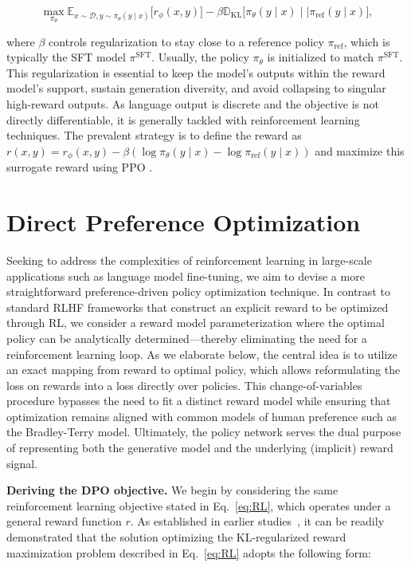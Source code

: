 \begin{equation}\label{eq:RL}
\max_{\pi_{\theta}}  \mathbb{E}_{x\sim \mathcal{D}, y\sim \pi_{\theta}(y \mid x)}\bigl[r_{\phi}(x, y)\bigr] - \beta\mathbb{D}_{\textrm{KL}}\bigl[\pi_{\theta}(y\mid x)\mid \mid \pi_\text{ref}(y\mid x)\bigr],
\end{equation}

where $\beta$ controls regularization to stay close to a reference policy $\pi_\text{ref}$, which is typically the SFT model $\pi^\text{SFT}$. Usually, the policy $\pi_\theta$ is initialized to match $\pi^\text{SFT}$. This regularization is essential to keep the model’s outputs within the reward model's support, sustain generation diversity, and avoid collapsing to singular high-reward outputs. As language output is discrete and the objective is not directly differentiable, it is generally tackled with reinforcement learning techniques. The prevalent strategy \citep{ziegler2020finetuning, stiennon2022learning, bai2022training, ouyang2022training} is to define the reward as ${r(x, y) = r_{\phi}(x, y) -\beta (\log \pi_{\theta}(y\mid x) - \log \pi_\text{ref}(y\mid x))}$ and maximize this surrogate reward using PPO \cite{schulman2017proximal}.

\section{Direct Preference Optimization}\label{sec:DPO}

Seeking to address the complexities of reinforcement learning in large-scale applications such as language model fine-tuning, we aim to devise a more straightforward preference-driven policy optimization technique. In contrast to standard RLHF frameworks that construct an explicit reward to be optimized through RL, we consider a reward model parameterization where the optimal policy can be analytically determined—thereby eliminating the need for a reinforcement learning loop. As we elaborate below, the central idea is to utilize an exact mapping from reward to optimal policy, which allows reformulating the loss on rewards into a loss directly over policies. This change-of-variables procedure bypasses the need to fit a distinct reward model while ensuring that optimization remains aligned with common models of human preference such as the Bradley-Terry model. Ultimately, the policy network serves the dual purpose of representing both the generative model and the underlying (implicit) reward signal.

\textbf{Deriving the DPO objective.} We begin by considering the same reinforcement learning objective stated in Eq.~\ref{eq:RL}, which operates under a general reward function $r$. As established in earlier studies~\citep{peters2007reinforcement, peng2019advantage, korbak2022reinforcement, go2023aligning}, it can be readily demonstrated that the solution optimizing the KL-regularized reward maximization problem described in Eq.~\ref{eq:RL} adopts the following form:

